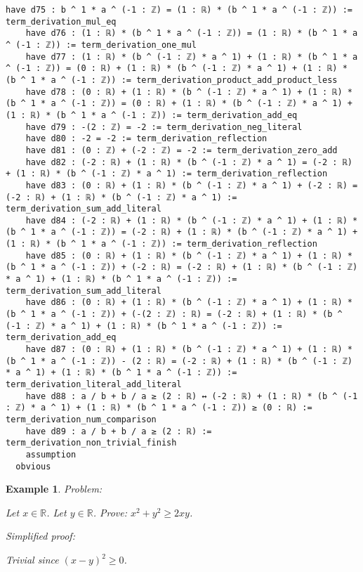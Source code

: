 \documentclass{article}
\newtheorem{example}{Example}
\begin{document}
\begin{tcolorbox}[colback=white!10, width=\linewidth]
\begin{lstlisting}[language=Lean4]
    have d75 : b ^ 1 * a ^ (-1 : ℤ) = (1 : ℝ) * (b ^ 1 * a ^ (-1 : ℤ)) := term_derivation_mul_eq
    have d76 : (1 : ℝ) * (b ^ 1 * a ^ (-1 : ℤ)) = (1 : ℝ) * (b ^ 1 * a ^ (-1 : ℤ)) := term_derivation_one_mul
    have d77 : (1 : ℝ) * (b ^ (-1 : ℤ) * a ^ 1) + (1 : ℝ) * (b ^ 1 * a ^ (-1 : ℤ)) = (0 : ℝ) + (1 : ℝ) * (b ^ (-1 : ℤ) * a ^ 1) + (1 : ℝ) * (b ^ 1 * a ^ (-1 : ℤ)) := term_derivation_product_add_product_less
    have d78 : (0 : ℝ) + (1 : ℝ) * (b ^ (-1 : ℤ) * a ^ 1) + (1 : ℝ) * (b ^ 1 * a ^ (-1 : ℤ)) = (0 : ℝ) + (1 : ℝ) * (b ^ (-1 : ℤ) * a ^ 1) + (1 : ℝ) * (b ^ 1 * a ^ (-1 : ℤ)) := term_derivation_add_eq
    have d79 : -(2 : ℤ) = -2 := term_derivation_neg_literal
    have d80 : -2 = -2 := term_derivation_reflection
    have d81 : (0 : ℤ) + (-2 : ℤ) = -2 := term_derivation_zero_add
    have d82 : (-2 : ℝ) + (1 : ℝ) * (b ^ (-1 : ℤ) * a ^ 1) = (-2 : ℝ) + (1 : ℝ) * (b ^ (-1 : ℤ) * a ^ 1) := term_derivation_reflection
    have d83 : (0 : ℝ) + (1 : ℝ) * (b ^ (-1 : ℤ) * a ^ 1) + (-2 : ℝ) = (-2 : ℝ) + (1 : ℝ) * (b ^ (-1 : ℤ) * a ^ 1) := term_derivation_sum_add_literal
    have d84 : (-2 : ℝ) + (1 : ℝ) * (b ^ (-1 : ℤ) * a ^ 1) + (1 : ℝ) * (b ^ 1 * a ^ (-1 : ℤ)) = (-2 : ℝ) + (1 : ℝ) * (b ^ (-1 : ℤ) * a ^ 1) + (1 : ℝ) * (b ^ 1 * a ^ (-1 : ℤ)) := term_derivation_reflection
    have d85 : (0 : ℝ) + (1 : ℝ) * (b ^ (-1 : ℤ) * a ^ 1) + (1 : ℝ) * (b ^ 1 * a ^ (-1 : ℤ)) + (-2 : ℝ) = (-2 : ℝ) + (1 : ℝ) * (b ^ (-1 : ℤ) * a ^ 1) + (1 : ℝ) * (b ^ 1 * a ^ (-1 : ℤ)) := term_derivation_sum_add_literal
    have d86 : (0 : ℝ) + (1 : ℝ) * (b ^ (-1 : ℤ) * a ^ 1) + (1 : ℝ) * (b ^ 1 * a ^ (-1 : ℤ)) + (-(2 : ℤ) : ℝ) = (-2 : ℝ) + (1 : ℝ) * (b ^ (-1 : ℤ) * a ^ 1) + (1 : ℝ) * (b ^ 1 * a ^ (-1 : ℤ)) := term_derivation_add_eq
    have d87 : (0 : ℝ) + (1 : ℝ) * (b ^ (-1 : ℤ) * a ^ 1) + (1 : ℝ) * (b ^ 1 * a ^ (-1 : ℤ)) - (2 : ℝ) = (-2 : ℝ) + (1 : ℝ) * (b ^ (-1 : ℤ) * a ^ 1) + (1 : ℝ) * (b ^ 1 * a ^ (-1 : ℤ)) := term_derivation_literal_add_literal
    have d88 : a / b + b / a ≥ (2 : ℝ) ↔ (-2 : ℝ) + (1 : ℝ) * (b ^ (-1 : ℤ) * a ^ 1) + (1 : ℝ) * (b ^ 1 * a ^ (-1 : ℤ)) ≥ (0 : ℝ) := term_derivation_num_comparison
    have d89 : a / b + b / a ≥ (2 : ℝ) := term_derivation_non_trivial_finish
    assumption
  obvious

\end{lstlisting}
\end{tcolorbox}


\begin{example}
Problem:
\begin{tcolorbox}[colback=yellow!10, width=\linewidth]
Let $x\in\mathbb{R}$. Let $y\in\mathbb{R}$.
    Prove: $x^2 + y^2 \ge 2xy$.
\end{tcolorbox}

Simplified proof:
\begin{tcolorbox}[colback=blue!10, width=\linewidth]
Trivial since $(x-y)^2 \ge 0$.
\end{tcolorbox}
\end{example}
\end{document}
